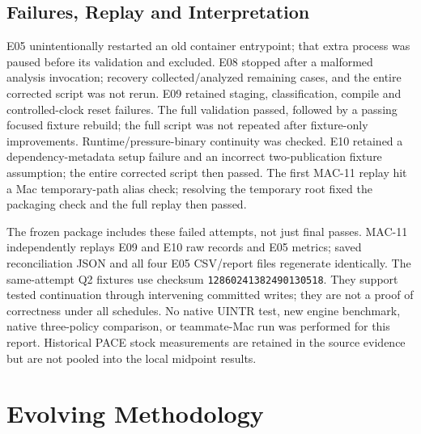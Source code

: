 \documentclass[sigconf,nonacm]{acmart}
\begin{document}
\subsection{Failures, Replay and Interpretation}
E05 unintentionally restarted an old container entrypoint; that extra process
was paused before its validation and excluded. E08 stopped after a malformed
analysis invocation; recovery collected/analyzed remaining cases, and the
entire corrected script was not rerun. E09 retained staging, classification,
compile and controlled-clock reset failures. The full validation passed,
followed by a passing focused fixture rebuild; the full script was not
repeated after fixture-only improvements. Runtime/pressure-binary continuity
was checked. E10 retained a dependency-metadata setup failure and an incorrect
two-publication fixture assumption; the entire corrected script then passed.
The first MAC-11 replay hit a Mac temporary-path alias check; resolving the
temporary root fixed the packaging check and the full replay then passed.

The frozen package includes these failed attempts, not just final passes.
MAC-11 independently replays E09 and E10 raw records and E05 metrics; saved
reconciliation JSON and all four E05 CSV/report files regenerate identically.
The same-attempt Q2 fixtures use checksum \texttt{12860241382490130518}.
They support tested continuation through intervening committed writes; they
are not a proof of correctness under all schedules. No native UINTR test,
new engine benchmark, native three-policy comparison, or teammate-Mac run
was performed for this report. Historical PACE stock measurements are retained
in the source evidence but are not pooled into the local midpoint results.

\section{Evolving Methodology}
\end{document}
